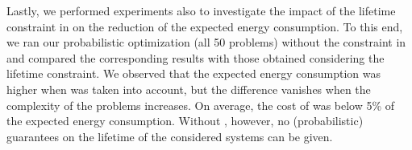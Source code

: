 Lastly, we performed experiments also to investigate the impact of the lifetime
constraint in  on the reduction of the expected
energy consumption. To this end, we ran our probabilistic optimization (all 50
problems) without the constraint in  and compared
the corresponding results with those obtained considering the lifetime
constraint. We observed that the expected energy consumption was higher when
 was taken into account, but the difference
vanishes when the complexity of the problems increases. On average, the cost of
 was below 5\% of the expected energy consumption.
Without , however, no (probabilistic) guarantees on
the lifetime of the considered systems can be given.
